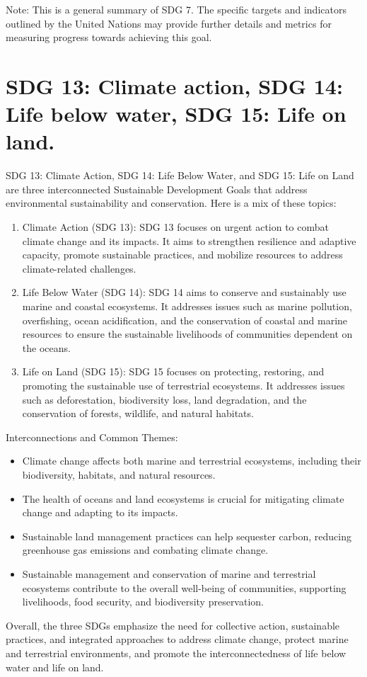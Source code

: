 \documentclass{article}
\begin{document}
Note: This is a general summary of SDG 7. The specific targets and indicators outlined by the United Nations may provide further details and metrics for measuring progress towards achieving this goal.

\section*{SDG 13: Climate action, SDG 14: Life below water, SDG 15: Life on land.}
SDG 13: Climate Action, SDG 14: Life Below Water, and SDG 15: Life on Land are three interconnected Sustainable Development Goals that address environmental sustainability and conservation. Here is a mix of these topics:

\begin{enumerate}
    \item Climate Action (SDG 13):
    SDG 13 focuses on urgent action to combat climate change and its impacts. It aims to strengthen resilience and adaptive capacity, promote sustainable practices, and mobilize resources to address climate-related challenges.
    \item Life Below Water (SDG 14):
    SDG 14 aims to conserve and sustainably use marine and coastal ecosystems. It addresses issues such as marine pollution, overfishing, ocean acidification, and the conservation of coastal and marine resources to ensure the sustainable livelihoods of communities dependent on the oceans.
    \item Life on Land (SDG 15):
    SDG 15 focuses on protecting, restoring, and promoting the sustainable use of terrestrial ecosystems. It addresses issues such as deforestation, biodiversity loss, land degradation, and the conservation of forests, wildlife, and natural habitats.
\end{enumerate}

Interconnections and Common Themes:

\begin{itemize}
    \item Climate change affects both marine and terrestrial ecosystems, including their biodiversity, habitats, and natural resources.
    \item The health of oceans and land ecosystems is crucial for mitigating climate change and adapting to its impacts.
    \item Sustainable land management practices can help sequester carbon, reducing greenhouse gas emissions and combating climate change.
    \item Sustainable management and conservation of marine and terrestrial ecosystems contribute to the overall well-being of communities, supporting livelihoods, food security, and biodiversity preservation.
\end{itemize}

Overall, the three SDGs emphasize the need for collective action, sustainable practices, and integrated approaches to address climate change, protect marine and terrestrial environments, and promote the interconnectedness of life below water and life on land.
\end{document}
